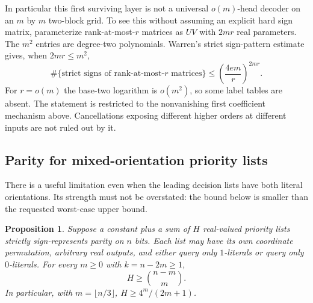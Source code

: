 \documentclass[11pt]{article}
\newtheorem{proposition}[theorem]{Proposition}
\begin{document}
In particular this first surviving layer is not a universal
$o(m)$-head decoder on an $m$ by $m$ two-block grid. To see this without
assuming an explicit hard sign matrix, parameterize rank-at-most-$r$
matrices as $UV$ with $2mr$ real parameters. The $m^2$ entries are
degree-two polynomials. Warren's strict sign-pattern estimate gives,
when $2mr\leq m^2$,
\[
 \#\{\text{strict signs of rank-at-most-}r\text{ matrices}\}
 \leq\left(\frac{4em}{r}\right)^{2mr}.
\]
For $r=o(m)$ the base-two logarithm is $o(m^2)$, so some label tables
are absent. The statement is restricted to the nonvanishing first
coefficient mechanism above. Cancellations exposing different higher
orders at different inputs are not ruled out by it.

\subsection{Parity for mixed-orientation priority lists}

There is a useful limitation even when the leading decision lists have
both literal orientations. Its strength must not be overstated: the
bound below is smaller than the requested worst-case upper bound.

\begin{proposition}\label{prop:mixed-list-parity}
Suppose a constant plus a sum of $H$ real-valued priority lists strictly
sign-represents parity on $n$ bits. Each list may have its own coordinate
permutation, arbitrary real outputs, and either query only $1$-literals
or query only $0$-literals. For every $m\geq0$ with $k=n-2m\geq1$,
\[
 H\geq\binom{n-m}{m}.
\]
In particular, with $m=\lfloor n/3\rfloor$,
$H\geq4^m/(2m+1)$.
\end{proposition}
\end{document}
